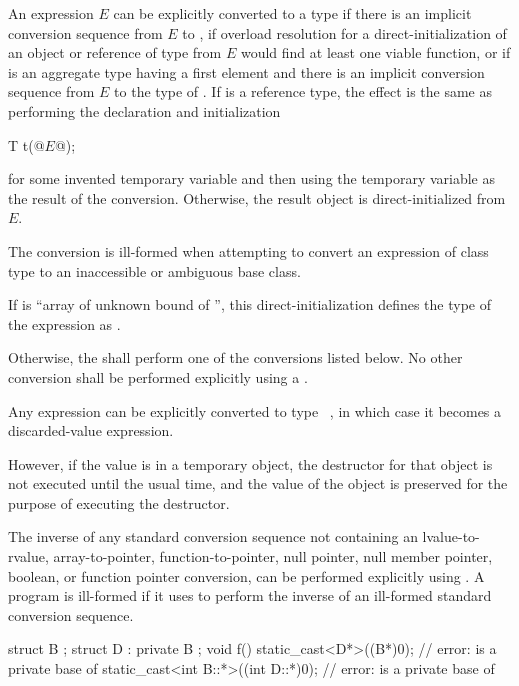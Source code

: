 \pnum
An expression $E$ can be explicitly converted to a type 
if there is an implicit conversion sequence
from $E$ to ,
if overload resolution for a direct-initialization
of an object or reference of type  from $E$
would find at least one viable function, or
if  is an aggregate type
having a first element  and
there is an implicit conversion sequence
from $E$ to the type of .
If  is a reference type, the effect is
the same as performing the declaration and initialization
\begin{codeblock}
T t(@$E$@);
\end{codeblock}
for some invented temporary variable 
and then using the temporary variable as the result of the conversion.
Otherwise, the result object is direct-initialized from $E$.
\begin{note}
The conversion is ill-formed when attempting to convert an
expression of class type to an inaccessible or ambiguous base class.
\end{note}
\begin{note}
If  is ``array of unknown bound of '',
this direct-initialization defines the type of the expression as .
\end{note}

\pnum
Otherwise, the  shall perform one of the conversions
listed below. No other conversion shall be performed explicitly using a
.

\pnum
Any expression can be explicitly converted to type \cv{}~,
in which case it becomes a discarded-value
expression.
\begin{note}
However, if the value is in a temporary
object, the destructor for that
object is
not executed until the usual time, and the value of the object is
preserved for the purpose of executing the destructor.
\end{note}


\pnum
The inverse of any standard conversion sequence not containing an
lvalue-to-rvalue,
array-to-pointer,
function-to-pointer,
null pointer, null member pointer,
boolean, or
function pointer
conversion, can be performed explicitly using . A
program is ill-formed if it uses  to perform the
inverse of an ill-formed standard conversion sequence.
\begin{example}
\begin{codeblock}
struct B { };
struct D : private B { };
void f() {
  static_cast<D*>((B*)0);               // error:  is a private base of 
  static_cast<int B::*>((int D::*)0);   // error:  is a private base of 
}
\end{codeblock}
\end{example}

